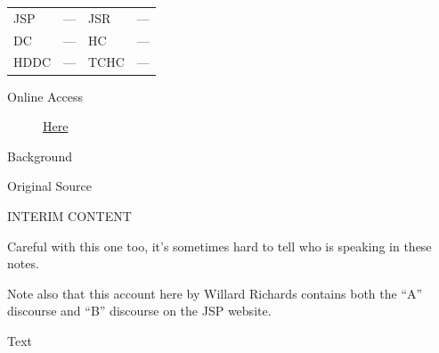 					\begin{tabular}{p{0.5in}p{1in}p{0.5in}p{1in}}
					JSP	 	& ---		& JSR 		& --- \\
					DC	 	& ---		& HC 		& --- \\
					HDDC 	& ---		& TCHC 		& --- \\
					\end{tabular}
				
				\begin{description}
					\item[Online Access] \href{https://www.josephsmithpapers.org/paper-summary/minutes-and-discourses-6-8-april-1843/1}{Here}
				\end{description}
				
				\begin{description}
					\item[Background]
				\end{description}
				
				
				\begin{description}
					\item[Original Source]
				\end{description}
				
					INTERIM CONTENT
					
					Careful with this one too, it's sometimes hard to tell who is speaking in these notes.
					
					Note also that this account here by Willard Richards contains both the ``A'' discourse and ``B'' discourse on the JSP website.
				
				
				\begin{description}
					\item[Text]
				\end{description}
					
